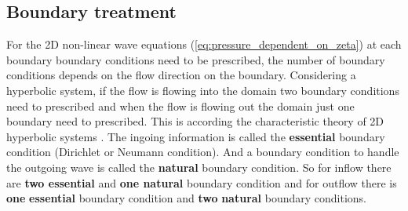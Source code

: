 %
\subsection{Boundary treatment}
For the 2D non-linear wave equations (\autoref{eq:pressure_dependent_on_zeta}) at each boundary boundary conditions need to be prescribed, the number of boundary conditions depends on the flow direction on the boundary.
Considering a hyperbolic system, if the flow is flowing into the domain two boundary conditions need to prescribed and when the flow is flowing out the domain just one boundary need to prescribed.
This is according the characteristic theory of 2D hyperbolic systems \citep{DaubertEtGraffe1967}.
The ingoing information is called the \textbf{essential} boundary condition (Dirichlet or Neumann condition).
And a boundary condition to handle the outgoing wave is called the \textbf{natural} boundary condition.
So for inflow there are \textbf{two essential} and \textbf{one natural} boundary condition and for outflow there is \textbf{one} \textbf{essential} boundary condition and \textbf{two} \textbf{natural} boundary conditions.

